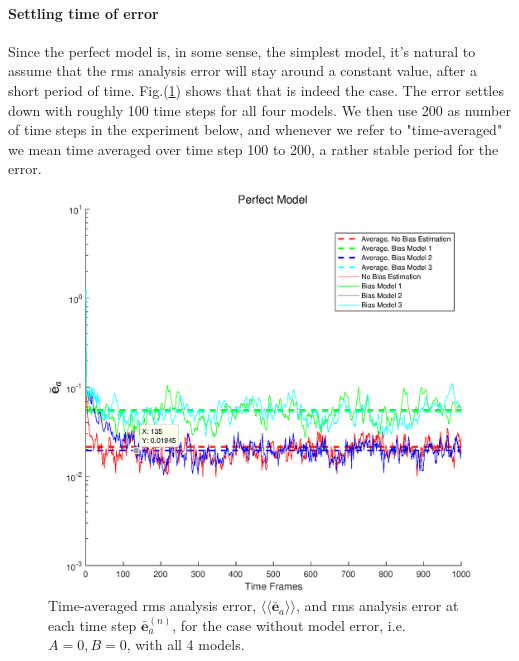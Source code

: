 \documentclass[twocolumn]{article}
\begin{document}
\paragraph{Settling time of error}
Since the perfect model is, in some sense, the simplest model, it's natural to assume that the rms analysis error will stay around a constant value, after a short period of time. Fig.(\ref{ErrVsTimeP1}) shows that that is indeed the case. The error settles down with roughly 100 time steps for all four models. We then use 200 as number of time steps in the experiment below, and whenever we refer to "time-averaged" we mean time averaged over time step 100 to 200, a rather stable period for the error.
\begin{figure} 
\centering
\includegraphics[scale=0.3]{Figures/ErrVsTimeP1}
\caption{Time-averaged rms analysis error, $\langle\langle\bar{\pmb{e}}_a\rangle\rangle$, and rms analysis error at each time step $\bar{\pmb{e}}_a^{(n)}$, for the case without model error, i.e. $A=0,B=0$, with all 4 models.}
\label{ErrVsTimeP1}
\end{figure}
\end{document}

